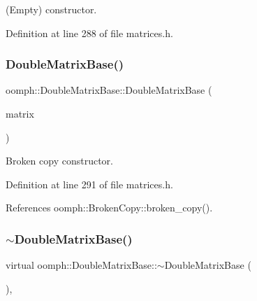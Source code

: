 (Empty) constructor. 



Definition at line 288 of file matrices.\+h.

\mbox{\label{classoomph_1_1DoubleMatrixBase_a9ac04a27de856720ef6478df71b1505a}} 
\subsubsection{\texorpdfstring{Double\+Matrix\+Base()}{DoubleMatrixBase()}\hspace{0.1cm}{\footnotesize\ttfamily [2/2]}}
{\footnotesize\ttfamily oomph\+::\+Double\+Matrix\+Base\+::\+Double\+Matrix\+Base (\begin{DoxyParamCaption}\item[{const \hyperlink{classoomph_1_1DoubleMatrixBase}{Double\+Matrix\+Base} \&}]{matrix }\end{DoxyParamCaption})\hspace{0.3cm}{\ttfamily [inline]}}



Broken copy constructor. 



Definition at line 291 of file matrices.\+h.



References oomph\+::\+Broken\+Copy\+::broken\+\_\+copy().

\mbox{\label{classoomph_1_1DoubleMatrixBase_a82ece2e3cfc355bb68ba78a2ed9dae9f}} 
\subsubsection{\texorpdfstring{$\sim$\+Double\+Matrix\+Base()}{~DoubleMatrixBase()}}
{\footnotesize\ttfamily virtual oomph\+::\+Double\+Matrix\+Base\+::$\sim$\+Double\+Matrix\+Base (\begin{DoxyParamCaption}{ }\end{DoxyParamCaption})\hspace{0.3cm}{\ttfamily [inline]}, {\ttfamily [virtual]}}



